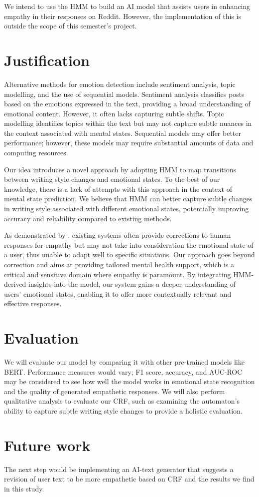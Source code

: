 \documentclass[conference,compsoc]{IEEEtran}
\begin{document}
We intend to use the HMM to build an AI model that assists users in enhancing empathy in their responses on Reddit. However, the implementation of this is outside the scope of this semester's project. 

\section{Justification}
Alternative methods for emotion detection include sentiment analysis, topic modelling, and the use of sequential models. Sentiment analysis classifies posts based on the emotions expressed in the text, providing a broad understanding of emotional content. However, it often lacks capturing subtle shifts. Topic modelling identifies topics within the text but may not capture subtle nuances in the context associated with mental states. Sequential models may offer better performance; however, these models may require substantial amounts of data and computing resources.

Our idea introduces a novel approach by adopting HMM to map transitions between writing style changes and emotional states. To the best of our knowledge, there is a lack of attempts with this approach in the context of mental state prediction. We believe that HMM can better capture subtle changes in writing style associated with different emotional states, potentially improving accuracy and reliability compared to existing methods. 

As demonstrated by \citet{Sharma+23:human-ai-empathic-conversation}, existing systems often provide corrections to human responses for empathy but may not take into consideration the emotional state of a user, thus unable to adapt well to specific situations. Our approach goes beyond correction and aims at providing tailored mental health support, which is a critical and sensitive domain where empathy is paramount. By integrating HMM-derived insights into the model, our system gains a deeper understanding of users' emotional states, enabling it to offer more contextually relevant and effective responses.

\section{Evaluation}
We will evaluate our model by comparing it with other pre-trained models like BERT. Performance measures would vary; F1 score, accuracy, and AUC-ROC may be considered to see how well the model works in emotional state recognition and the quality of generated empathetic responses. We will also perform qualitative analysis to evaluate our CRF, such as examining the automaton's ability to capture subtle writing style changes to provide a holistic evaluation.

\section{Future work}
The next step would be implementing an AI-text generator that suggests a revision of user text to be more empathetic based on CRF and the results we find in this study. 



\end{document}
